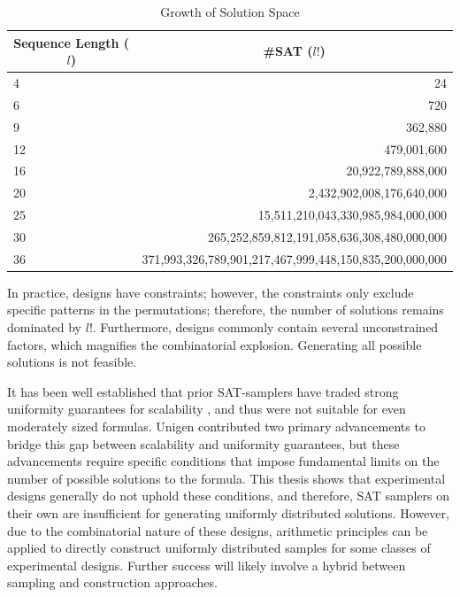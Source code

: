 \begin{table}[htb]
  \centering
  \caption{Growth of Solution Space}
\begin{tabular}{|l|r|}
\hline
\multicolumn{1}{|c|}{\textbf{Sequence Length ($l$)}} & \multicolumn{1}{c|}{\textbf{\#SAT ($l!$)}}              \\ \hline
4                                                    & 24                                                      \\ \hline
6                                                    & 720                                                     \\ \hline
9                                                    & 362,880                                                 \\ \hline
12                                                   & 479,001,600                                             \\ \hline
16                                                   & 20,922,789,888,000                                      \\ \hline
20                                                   & 2,432,902,008,176,640,000                               \\ \hline
25                                                   & 15,511,210,043,330,985,984,000,000                      \\ \hline
30                                                   & 265,252,859,812,191,058,636,308,480,000,000             \\ \hline
36                                                   & 371,993,326,789,901,217,467,999,448,150,835,200,000,000 \\ \hline
\end{tabular}
\label{tab:factorial_explosion}
\end{table}

In practice, designs have constraints; however, the constraints only exclude specific patterns in the permutations; therefore, the number of solutions remains dominated by $l!$. Furthermore, designs commonly contain several unconstrained factors, which magnifies the combinatorial explosion. Generating all possible solutions is not feasible.

It has been well established that prior SAT-samplers have traded strong uniformity guarantees for scalability \cite{chakraborty_balancing_2014}, and thus were not suitable for even moderately sized formulas. Unigen \cite{chakraborty_balancing_2014} contributed two primary advancements to bridge this gap between scalability and uniformity guarantees, but these advancements require specific conditions that impose fundamental limits on the number of possible solutions to the formula. This thesis shows that experimental designs generally do not uphold these conditions, and therefore, SAT samplers on their own are insufficient for generating uniformly distributed solutions. However, due to the combinatorial nature of these designs, arithmetic principles can be applied to directly construct uniformly distributed samples for some classes of experimental designs. Further success will likely involve a hybrid between sampling and construction approaches.
